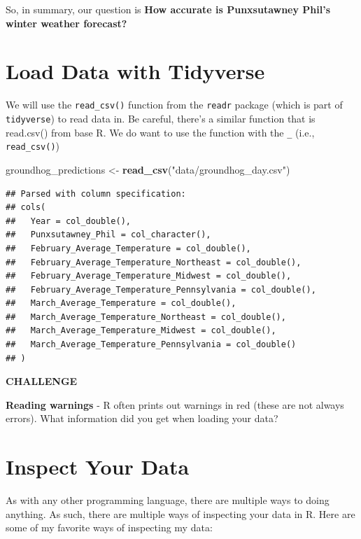 \documentclass[
]{book}
\newenvironment{Shaded}{\begin{snugshade}}{\end{snugshade}}
\newcommand{\KeywordTok}[1]{\textcolor[rgb]{0.13,0.29,0.53}{\textbf{#1}}}
\newcommand{\NormalTok}[1]{#1}
\newcommand{\StringTok}[1]{\textcolor[rgb]{0.31,0.60,0.02}{#1}}
\begin{document}
So, in summary, our question is \textbf{How accurate is Punxsutawney Phil's winter weather forecast?}

\hypertarget{load-data-with-tidyverse}{%
\section{Load Data with Tidyverse}\label{load-data-with-tidyverse}}

We will use the \texttt{read\_csv()} function from the \texttt{readr} package (which is part of \texttt{tidyverse}) to read data in. Be careful, there's a similar function that is read.csv() from base R. We do want to use the function with the \texttt{\_} (i.e., \texttt{read\_csv()})

\begin{Shaded}
\begin{Highlighting}[]
\NormalTok{groundhog_predictions <-}\StringTok{ }\KeywordTok{read_csv}\NormalTok{(}\StringTok{"data/groundhog_day.csv"}\NormalTok{)}
\end{Highlighting}
\end{Shaded}

\begin{verbatim}
## Parsed with column specification:
## cols(
##   Year = col_double(),
##   Punxsutawney_Phil = col_character(),
##   February_Average_Temperature = col_double(),
##   February_Average_Temperature_Northeast = col_double(),
##   February_Average_Temperature_Midwest = col_double(),
##   February_Average_Temperature_Pennsylvania = col_double(),
##   March_Average_Temperature = col_double(),
##   March_Average_Temperature_Northeast = col_double(),
##   March_Average_Temperature_Midwest = col_double(),
##   March_Average_Temperature_Pennsylvania = col_double()
## )
\end{verbatim}

\textbf{CHALLENGE}

\textbf{Reading warnings} - R often prints out warnings in red (these are not always errors). What information did you get when loading your data?

\hypertarget{inspect-your-data}{%
\section{Inspect Your Data}\label{inspect-your-data}}

As with any other programming language, there are multiple ways to doing anything. As such, there are multiple ways of inspecting your data in R. Here are some of my favorite ways of inspecting my data:
\end{document}
